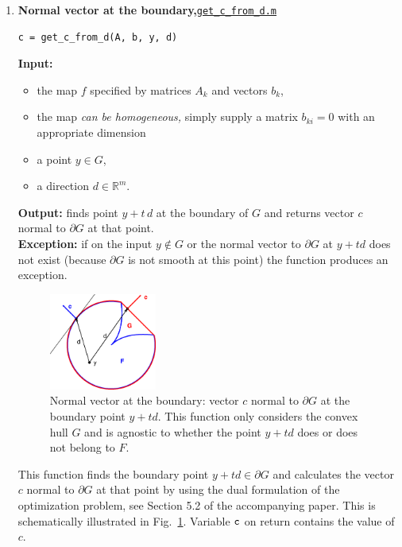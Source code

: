 \documentclass[a4paper]{article}
\newcommand{\R}{\mathbb{R}}
\theoremstyle{definition}
\begin{document}
\begin{enumerate}
The variable $\tt t$ on return contains the value of $t$, the variable {\tt  is\_in\_F=1} if the boundary point $y+t\,d$ belongs to $F$, and variable {\tt  is\_in\_F=0} if feasibility of $y+t\,d$ with respect to $F$ is uncertain.


\item {\bf Normal vector at the boundary,\hskip 6pt}\underline{\tt get\_c\_from\_d.m} 
\begin{verbatim}
c = get_c_from_d(A, b, y, d)
\end{verbatim}
{\bf Input:}
\begin{itemize}
	\item the map $f$ specified by matrices $A_k$ and vectors $b_k$,
	\item the map {\it can be homogeneous,} simply supply a matrix $b_{ki}=0$ with an appropriate dimension
	\item a point $y\in G$,
	\item a direction $d\in\R^m$.
\end{itemize}
{\bf Output:}  finds point $y+t\,d$ at the boundary of $G$ and returns vector $c$ normal to $\partial G$ at that point.\\
{\bf Exception:} if on the input $y\notin G$ or the normal vector to $\partial G$ at $y+td$ does not exist (because $\partial G$ is not smooth at this point)  the function produces an exception.


\begin{figure}[H]
	\centering\includegraphics[width=100pt]{fig/get_c_from_d}
\captionsetup{width=.8\linewidth}
	\caption{Normal vector at the boundary: vector $c$ normal to $\partial G$ at the boundary point $y+td$. This function only considers the convex hull $G$ and is agnostic to whether the point $y+td$ does or does not belong to $F$.}
\label{fig:three}
\end{figure}

This function finds the boundary point $y+td\in \partial G$ and calculates the vector $c$ normal to $\partial G$ at that point by using the dual formulation of the optimization problem, see Section 5.2 of the accompanying paper.
This is schematically illustrated in Fig.~\ref{fig:three}. Variable $\tt c$ on return contains the value of $c$.


\end{enumerate}
\end{document}
